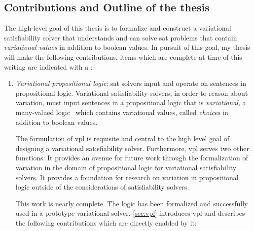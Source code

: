 \subsection{Contributions and Outline of the thesis}%
\label{sec:prop-contr}
The high-level goal of this thesis is to formalize and construct a variational
satisfiability solver that understands and can solve \ac{sat} problems that
contain \emph{variational values} in addition to boolean values. In pursuit of
this goal, my thesis will make the following contributions, items which are
complete at time of this writing are indicated with a \checkmark:
\begin{enumerate}
\item\label{vpl-deliverable} \emph{Variational propositional logic}: \ac{sat}
  solvers input and operate on sentences in propositional
  logic\cite{10.5555/1324777}. Variational satisfiability solvers, in order to
  reason about variation, must input sentences in a propositional logic that is
  \textit{variational}, \ie{} a many-valued logic~\cite{Rescher1969-RESML} which
  contains variational values, called \emph{choices} in addition to boolean
  values.

  The formulation of \ac{vpl} is requisite and central to the high level goal of
  designing a variational satisfiability solver. Furthermore, \ac{vpl} serves
  two other functions: It provides an avenue for future work through the
  formalization of variation in the domain of propositional logic for
  variational satisfiability solvers. It provides a foundation for research on
  variation in propositional logic outside of the considerations of
  satisfiability solvers.

  This work is nearly complete. The logic has been formalized and successfully
  used in a prototype variational solver\cite{10.1145/3382025.3414965}.
  \autoref{sec:vpl} introduces \ac{vpl} and describes the following
  contributions which are directly enabled by it:


\end{enumerate}
